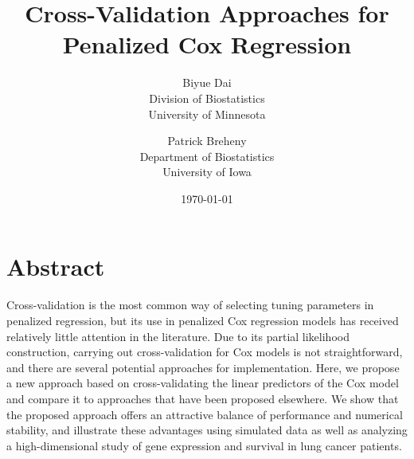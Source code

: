 \documentclass{article}
\title{Cross-Validation Approaches for Penalized Cox Regression}
\author{Biyue Dai \\ Division of Biostatistics \\ University of Minnesota
  \and
  Patrick Breheny \\ Department of Biostatistics \\ University of Iowa}
\date{\today}
\begin{document}
\maketitle

\section*{Abstract}
Cross-validation is the most common way of selecting tuning parameters in penalized regression, but its use in penalized Cox regression models has received relatively little attention in the literature. Due to its partial likelihood construction, carrying out cross-validation for Cox models is not straightforward, and there are several potential approaches for implementation. Here, we propose a new approach based on cross-validating the linear predictors of the Cox model and compare it to approaches that have been proposed elsewhere. We show that the proposed approach offers an attractive balance of performance and numerical stability, and illustrate these advantages using simulated data as well as analyzing a high-dimensional study of gene expression and survival in lung cancer patients.





\end{document}
